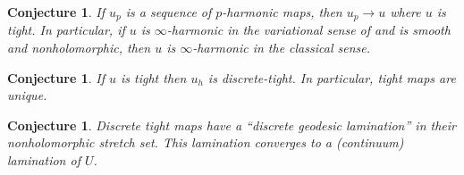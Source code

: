 \documentclass[reqno,11pt]{amsart}
\newtheorem{conjecture}[theorem]{Conjecture}
\theoremstyle{definition}
\numberwithin{equation}{section}
\begin{document}
\begin{conjecture}
If $u_p$ is a sequence of $p$-harmonic maps, then $u_p \to u$ where $u$ is tight.
In particular, if $u$ is $\infty$-harmonic in the variational sense of \cite{daskalopoulos2022} and is smooth and nonholomorphic, then $u$ is $\infty$-harmonic in the classical sense.
\end{conjecture}

\begin{conjecture}
If $u$ is tight then $u_h$ is discrete-tight.
In particular, tight maps are unique.
\end{conjecture}

\begin{conjecture}
Discrete tight maps have a ``discrete geodesic lamination'' in their nonholomorphic stretch set.
This lamination converges to a (continuum) lamination of $U$.
\end{conjecture}

\printbibliography
\end{document}
